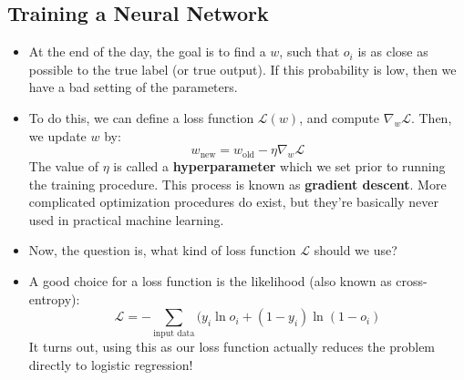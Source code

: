 \subsection{Training a Neural Network}
\begin{itemize}
	\item At the end of the day, the goal is to find a \( w \), such that \( o_i \)
		is as close as possible to the true label (or true output). If this
		probability is low, then we have a bad setting of the parameters.  
	\item To do this, we can define a loss function \( \mathcal{L}(w) \), and compute
		\( \nabla_w \mathcal{L} \). Then, we update \( w \) by:
		\[
			w_{\text{new}} = w_\text{old} - \eta \nabla_w\mathcal{L}
		\]
		The value of \( \eta \) is called a \textbf{hyperparameter} which we set prior
		to running the training procedure. This process is known as 
		\textbf{gradient descent}. More complicated
		optimization procedures do exist, but they're basically never used in
		practical machine learning.  
	\item Now, the question is, what kind of loss function \( \mathcal{L} \) should
		we use? 
	\item A good choice for a loss function is the likelihood (also known as
		cross-entropy):
		\[
			\mathcal{L} = -\sum_\text{input data}(y_i \ln o_i + (1 - y_i) \ln( 1 -
			o_i) 
		\]
		It turns out, using this as our loss function actually reduces the problem
		directly to logistic regression!  
\end{itemize}
